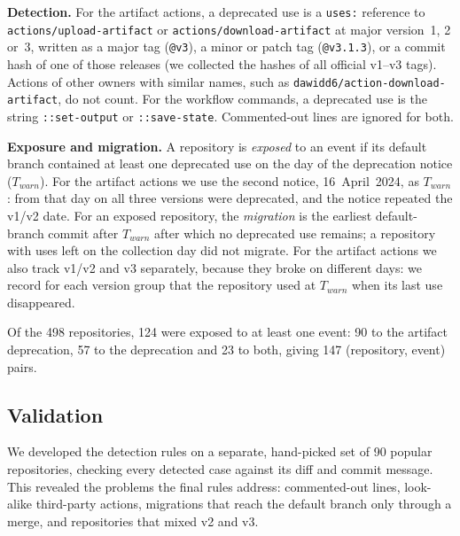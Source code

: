 \textbf{Detection.}
For the artifact actions, a deprecated use is a \texttt{uses:} reference to \texttt{actions/upload-artifact} or \texttt{actions/download-artifact} at major version~1, 2 or~3, written as a major tag (\texttt{@v3}), a minor or patch tag (\texttt{@v3.1.3}), or a commit hash of one of those releases (we collected the hashes of all official v1--v3 tags).
Actions of other owners with similar names, such as \texttt{dawidd6/action-download-artifact}, do not count.
For the workflow commands, a deprecated use is the string \texttt{::set-output} or \texttt{::save-state}.
Commented-out lines are ignored for both.

\textbf{Exposure and migration.}
A repository is \emph{exposed} to an event if its default branch contained at least one deprecated use on the day of the deprecation notice ($T_{warn}$).
For the artifact actions we use the second notice, 16~April~2024, as $T_{warn}$: from that day on all three versions were deprecated, and the notice repeated the v1/v2 date.
For an exposed repository, the \emph{migration} is the earliest default-branch commit after $T_{warn}$ after which no deprecated use remains; a repository with uses left on the collection day did not migrate.
For the artifact actions we also track v1/v2 and v3 separately, because they broke on different days: we record for each version group that the repository used at $T_{warn}$ when its last use disappeared.

Of the 498 repositories, 124 were exposed to at least one event: 90 to the artifact deprecation, 57 to the \so{} deprecation and 23 to both, giving 147 (repository, event) pairs.

\subsection{Validation}
We developed the detection rules on a separate, hand-picked set of 90 popular repositories, checking every detected case against its diff and commit message.
This revealed the problems the final rules address: commented-out lines, look-alike third-party actions, migrations that reach the default branch only through a merge, and repositories that mixed v2 and v3.

